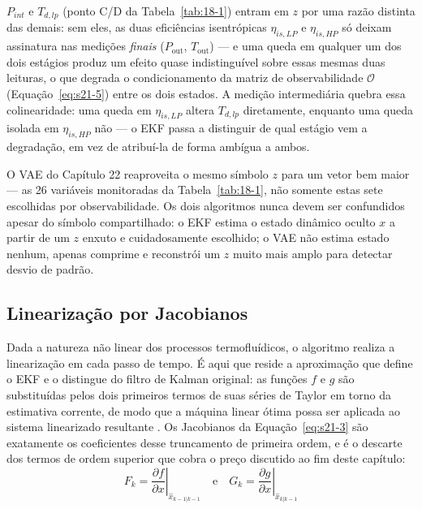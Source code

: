 \documentclass[12pt,a4paper]{article}
\numberwithin{equation}{section}
\numberwithin{table}{section}
\numberwithin{figure}{section}
\begin{document}
	$P_{int}$ e $T_{d,lp}$ (ponto C/D da Tabela~\ref{tab:18-1}) entram em $z$ por uma razão distinta das demais: sem eles, as duas eficiências isentrópicas $\eta_{is,LP}$ e $\eta_{is,HP}$ só deixam assinatura nas medições \textit{finais} ($P_{\text{out}}$, $T_{\text{out}}$) — e uma queda em qualquer um dos dois estágios produz um efeito quase indistinguível sobre essas mesmas duas leituras, o que degrada o condicionamento da matriz de observabilidade $\mathcal{O}$ (Equação~\eqref{eq:s21-5}) entre os dois estados. A medição intermediária quebra essa colinearidade: uma queda em $\eta_{is,LP}$ altera $T_{d,lp}$ diretamente, enquanto uma queda isolada em $\eta_{is,HP}$ não — o EKF passa a distinguir de qual estágio vem a degradação, em vez de atribuí-la de forma ambígua a ambos.

	O VAE do Capítulo 22 reaproveita o mesmo símbolo $z$ para um vetor bem maior — as 26 variáveis monitoradas da Tabela~\ref{tab:18-1}, não somente estas sete escolhidas por observabilidade. Os dois algoritmos nunca devem ser confundidos apesar do símbolo compartilhado: o EKF estima o estado dinâmico oculto $x$ a partir de um $z$ enxuto e cuidadosamente escolhido; o VAE não estima estado nenhum, apenas comprime e reconstrói um $z$ muito mais amplo para detectar desvio de padrão.

	\subsection{Linearização por Jacobianos}
	Dada a natureza não linear dos processos termofluídicos, o algoritmo realiza a linearização em cada passo de tempo. É aqui que reside a aproximação que define o EKF e o distingue do filtro de Kalman original: as funções $f$ e $g$ são substituídas pelos dois primeiros termos de suas séries de Taylor em torno da estimativa corrente, de modo que a máquina linear ótima possa ser aplicada ao sistema linearizado resultante \cite[Cap.~13]{simon}. Os Jacobianos da Equação~\eqref{eq:s21-3} são exatamente os coeficientes desse truncamento de primeira ordem, e é o descarte dos termos de ordem superior que cobra o preço discutido ao fim deste capítulo:
	\begin{equation}\label{eq:s21-3}
	F_k = \left. \frac{\partial f}{\partial x} \right|_{\hat{x}_{k-1|k-1}} \quad \text{e} \quad G_k = \left. \frac{\partial g}{\partial x} \right|_{\hat{x}_{k|k-1}}
\end{equation}
\end{document}
